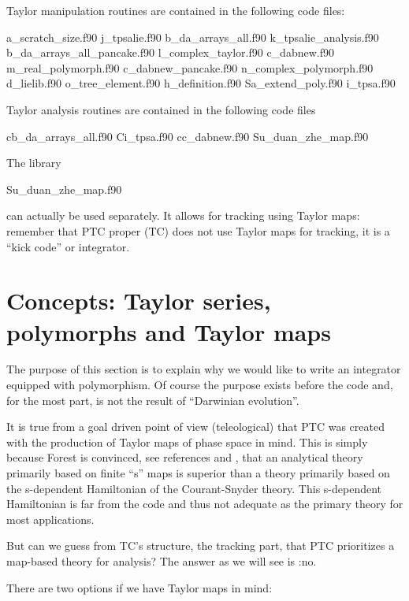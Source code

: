 \documentclass{hitec}     %
\newcommand{\Section}[1]{\section{#1}\vspace*{-1ex}}
\begin{document}
Taylor manipulation routines are contained in the following code files:
\begin{code}
a_scratch_size.f90                j_tpsalie.f90           
b_da_arrays_all.f90               k_tpsalie_analysis.f90
b_da_arrays_all_pancake.f90       l_complex_taylor.f90    
c_dabnew.f90                      m_real_polymorph.f90    
c_dabnew_pancake.f90              n_complex_polymorph.f90
d_lielib.f90                      o_tree_element.f90      
h_definition.f90                  Sa_extend_poly.f90     
i_tpsa.f90
\end{code}

Taylor analysis routines are contained in the following code files
\begin{code}
cb_da_arrays_all.f90               Ci_tpsa.f90
cc_dabnew.f90                      Su_duan_zhe_map.f90
\end{code}

{\color{h}
The library 
\begin{code}
             Su_duan_zhe_map.f90
\end{code}
can actually be used separately. It allows for   tracking using Taylor maps: remember that PTC proper (TC) does not use Taylor maps for tracking, it is a ``kick code'' or integrator.}
\Section{Concepts: Taylor series, polymorphs and Taylor maps}
\label{s:concepts}

The purpose of this section is to explain why we would like to write an integrator equipped with polymorphism. Of course the purpose exists before the code and, for the most part, is not the result of ``Darwinian evolution''. 


 It is true from a goal driven point of view (teleological) that PTC was created with  the production of Taylor maps of phase space in mind. This is simply because Forest is convinced, see references \cite{thebook} and \cite{thenewbook}, that an analytical theory primarily based on finite ``s'' maps is superior than a theory primarily based on the  s-dependent Hamiltonian of the Courant-Snyder theory. This s-dependent Hamiltonian is far from the code and thus not adequate as the primary theory for most applications. 
 
 But can we guess from TC's structure, the tracking part, that PTC prioritizes  a map-based theory for analysis? The answer as we will see is :no.
 
 There are two options if we have Taylor maps in mind: 
 
\end{document}
